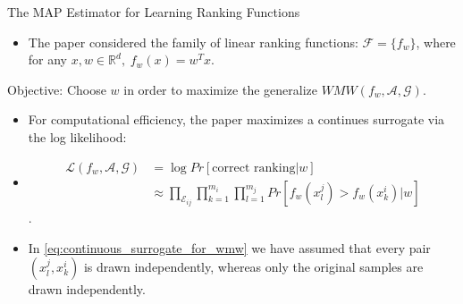 \documentclass[8pt]{beamer}
\renewcommand{\|}[1][.3em]{\hspace{#1}|\hspace{#1}}
\renewcommand{\,}[1][.3em]{,\hspace{#1}}
\newlength{\wideitemsep}
\let\olditem\item
\renewcommand{\item}{\setlength{\itemsep}{\wideitemsep}\olditem}
\newcommand{\m}[1]{\mathcal{#1}}
\renewcommand{\,}{,\hspace{3pt}}
\renewcommand{\|}{\hspace{3pt}|\hspace{3pt}}
\begin{document}
\begin{frame}{The MAP Estimator for Learning Ranking Functions}
    \begin{itemize}
    \item The paper considered the family of linear ranking functions: $\m{F} = \{f_w\}$, where for any $x, w \in \mathbb{R}^d\,f_w(x) = w^Tx$.
    \end{itemize}
    \begin{block}{Objective:}
    Choose $w$ in order to maximize the generalize $WMW(f_w, \m{A}, \m{G})$.    
    \end{block}
    \begin{itemize}
    \item For computational efficiency, the paper maximizes a continues surrogate via the log likelihood:
    \item[] \begin{align}
    \m{L}(f_w, \m{A}, \m{G}) &= \log Pr[\text{correct ranking}|w]\nonumber\\
                             &\approx \prod_{\m{E}_{ij}}\prod_{k=1}^{m_i}\prod_{l=1}^{m_j}Pr[f_w(x_l^j) > f_w(x_k^i) | w]
                             \label{eq:continuous_surrogate_for_wmw}
    \end{align}.
    \item In \ref{eq:continuous_surrogate_for_wmw} we have assumed that every pair $(x_l^j,x_k^i)$ is drawn independently, whereas only the original samples are drawn independently.
    \end{itemize}
\end{frame}
\end{document}
